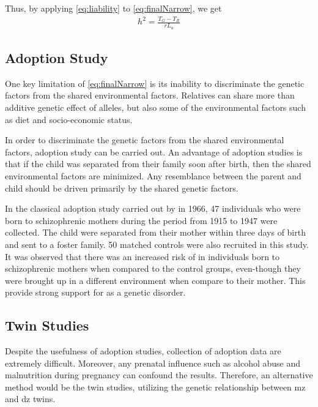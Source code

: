 	Thus, by applying \cref{eq:liability} to \cref{eq:finalNarrow}, we get
	\begin{align}
	h^2 =\frac{T_G-T_R}{rL_a}
	\end{align}
	
	\subsection{Adoption Study}
	One key limitation of \cref{eq:finalNarrow} is its inability to discriminate the genetic factors from the shared environmental factors.
	Relatives can share more than additive genetic effect of alleles, but also some of the environmental factors such as diet and socio-economic status. 
	
	In order to discriminate the genetic factors from the shared environmental factors, adoption study can be carried out. 
	An advantage of adoption studies is that if the child was separated from their family soon after birth, then the shared environmental factors are minimized.
	Any resemblance between the parent and child should be driven primarily by the shared genetic factors.
	
	In the classical adoption study carried out by \citet{HESTON1966} in 1966, 47 individuals who were born to schizophrenic mothers during the period from 1915 to 1947 were collected. 
	The child were separated from their mother within three days of birth and sent to a foster family. 
	50 matched controls were also recruited in this study.
	It was observed that there was an increased risk of  in individuals born to schizophrenic mothers when compared to the control groups, even-though they were brought up in a different environment when compare to their mother.
	This provide strong support for  as a genetic disorder. 
	
	\subsection{Twin Studies}
	Despite the usefulness of adoption studies, collection of adoption data are extremely difficult. 
	Moreover, any prenatal influence such as alcohol abuse and malnutrition during pregnancy can confound the results.
	Therefore, an alternative method would be the twin studies, utilizing the genetic relationship between \gls{mz} and \gls{dz} twins.
	
